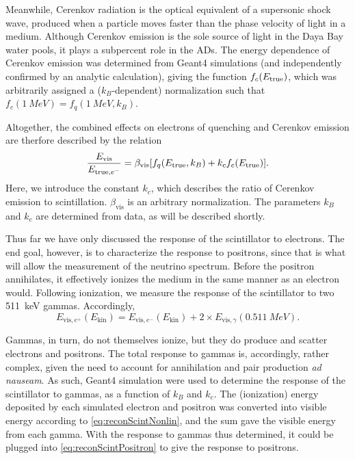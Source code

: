 \documentclass[../thesis.tex]{subfiles}
\begin{document}
Meanwhile, Cerenkov radiation is the optical equivalent of a supersonic shock wave, produced when a particle moves faster than the phase velocity of light in a medium. Although Cerenkov emission is the sole source of light in the Daya Bay water pools, it plays a subpercent role in the ADs. The energy dependence of Cerenkov emission was determined from Geant4 simulations (and independently confirmed by an analytic calculation), giving the function $f_c(E_\mathrm{true})$, which was arbitrarily assigned a ($k_B$-dependent) normalization such that $f_c(\SI{1}{MeV}) = f_q(\SI{1}{MeV}, k_B)$. 

Altogether, the combined effects on electrons of quenching and Cerenkov emission are therfore described by the relation
\begin{equation}
  \label{eq:reconScintNonlin}
  \frac{E_{\mathrm{vis}}}{E_{\mathrm{true},e^-}} = \beta_{\mathrm{vis}}[f_q(E_\mathrm{true}, k_B) + k_c f_c(E_\mathrm{true})].
\end{equation}
Here, we introduce the constant $k_c$, which describes the ratio of Cerenkov emission to scintillation. $\beta_{\mathrm{vis}}$ is an arbitrary normalization. The parameters $k_B$ and $k_c$ are determined from data, as will be described shortly.

Thus far we have only discussed the response of the scintillator to electrons. The end goal, however, is to characterize the response to positrons, since that is what will allow the measurement of the neutrino spectrum. Before the positron annihilates, it effectively ionizes the medium in the same manner as an electron would. Following ionization, we measure the response of the scintillator to two 511~keV gammas. Accordingly,
\begin{equation}
  \label{eq:reconScintPositron}
  E_{\mathrm{vis},e^+}(E_{\mathrm{kin}}) = E_{\mathrm{vis},e^-}(E_{\mathrm{kin}}) + 2 \times E_{\mathrm{vis},\gamma}(\SI{0.511}{MeV}).
\end{equation}

Gammas, in turn, do not themselves ionize, but they do produce and scatter electrons and positrons. The total response to gammas is, accordingly, rather complex, given the need to account for annihilation and pair production \emph{ad nauseam}. As such, Geant4 simulation were used to determine the response of the scintillator to gammas, as a function of $k_B$ and $k_c$. The (ionization) energy deposited by each simulated electron and positron was converted into visible energy according to \eqref{eq:reconScintNonlin}, and the sum gave the visible energy from each gamma. With the response to gammas thus determined, it could be plugged into \eqref{eq:reconScintPositron} to give the response to positrons.
\end{document}
